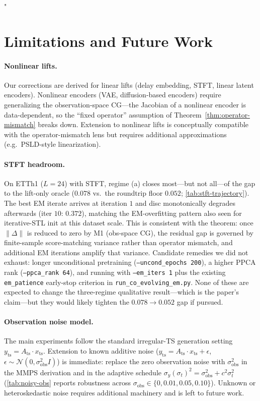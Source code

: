 "\documentclass{article}
\theoremstyle{plain}
\theoremstyle{definition}
\theoremstyle{remark}
\newcommand{\Ats}{A_{\mathrm{ts}}}
\newcommand{\yts}{y_{\mathrm{ts}}}
\newcommand{\xts}{x_{\mathrm{ts}}}
\begin{document}
\section{Limitations and Future Work}
\label{app:limitations}

\paragraph{Nonlinear lifts.}
Our corrections are derived for linear lifts (delay embedding, STFT, linear latent encoders). Nonlinear encoders (VAE, diffusion-based encoders) require generalizing the observation-space CG---the Jacobian of a nonlinear encoder is data-dependent, so the ``fixed operator'' assumption of Theorem~\ref{thm:operator-mismatch} breaks down. Extension to nonlinear lifts is conceptually compatible with the operator-mismatch lens but requires additional approximations (e.g.\ PSLD-style linearization).

\paragraph{STFT headroom.}
On ETTh1 ($L{=}24$) with STFT, regime (a) closes most---but not all---of the gap to the lift-only oracle ($0.078$ vs.\ the roundtrip floor $0.052$; \cref{tab:stft-trajectory}). The best EM iterate arrives at iteration $1$ and disc monotonically degrades afterwards (iter $10$: $0.372$), matching the EM-overfitting pattern also seen for iterative-STL init at this dataset scale. This is consistent with the theorem: once $\|\Delta\|$ is reduced to zero by M1 (obs-space CG), the residual gap is governed by finite-sample score-matching variance rather than operator mismatch, and additional EM iterations amplify that variance. Candidate remedies we did not exhaust: longer unconditional pretraining (\texttt{--uncond\_epochs 200}), a higher PPCA rank (\texttt{--ppca\_rank 64}), and running with \texttt{--em\_iters 1} plus the existing \texttt{em\_patience} early-stop criterion in \texttt{run\_co\_evolving\_em.py}. None of these are expected to change the three-regime qualitative result---which is the paper's claim---but they would likely tighten the $0.078{\to}0.052$ gap if pursued.

\paragraph{Observation noise model.}
The main experiments follow the standard irregular-TS generation setting $\yts = \Ats \cdot \xts$. Extension to known additive noise ($\yts = \Ats \cdot \xts + \epsilon$, $\epsilon \sim \mathcal{N}(0, \sigma_{\mathrm{obs}}^2 I)$) is immediate: replace the zero observation noise with $\sigma_{\mathrm{obs}}^2$ in the MMPS derivation and in the adaptive schedule $\sigma_y(\sigma_t)^2 = \sigma_{\mathrm{obs}}^2 + c^2 \sigma_t^2$ (\cref{tab:noisy-obs} reports robustness across $\sigma_{\mathrm{obs}} \in \{0, 0.01, 0.05, 0.10\}$). Unknown or heteroskedastic noise requires additional machinery and is left to future work.
\end{document}
